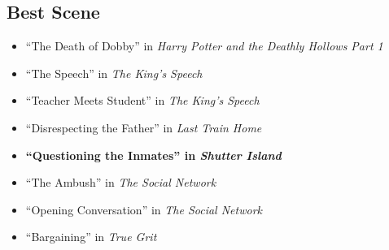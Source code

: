 \documentclass{article}
\begin{document}
\begin{multicols}{2}
\subsection*{Best Scene}
  \begin{itemize}
    \setlength{\parskip}{0pt}
    \setlength{\itemsep}{0pt}
    \item[] ``The Death of Dobby'' in \emph{Harry Potter and the Deathly Hollows Part 1}
    \item[] ``The Speech'' in \emph{The King's Speech}
    \item[] ``Teacher Meets Student'' in \emph{The King's Speech}
    \item[] ``Disrespecting the Father'' in \emph{Last Train Home}
    \item \textbf{``Questioning the Inmates'' in \emph{Shutter Island}}
    \item[] ``The Ambush'' in \emph{The Social Network}
    \item[] ``Opening Conversation'' in \emph{The Social Network}
    \item[] ``Bargaining'' in \emph{True Grit}
  \end{itemize}

\end{multicols}
\end{document}
